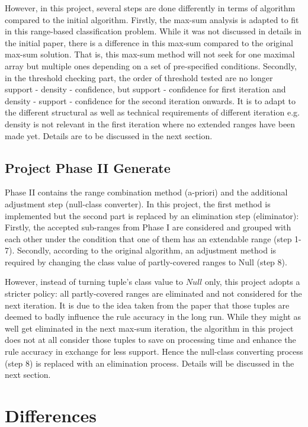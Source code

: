 However, in this project, several steps are done differently in terms of algorithm compared to the initial algorithm. Firstly, the max-sum analysis is adapted to fit in this range-based classification problem. While it was not discussed in details in the initial paper, there is a difference in this max-sum compared to the original max-sum solution. That is, this max-sum method will not seek for one maximal array but multiple ones depending on a set of pre-specified conditions. Secondly, in the threshold checking part, the order of threshold tested are no longer support - density - confidence, but support - confidence for first iteration and density - support - confidence for the second iteration onwards. It is to adapt to the different structural as well as technical requirements of different iteration e.g. density is not relevant in the first iteration where no extended ranges have been made yet. Details are to be discussed in the next section.

\subsection{Project Phase II Generate}

Phase II contains the range combination method (a-priori) and the additional adjustment step (null-class converter). In this project, the first method is implemented but the second part is replaced by an elimination step (eliminator): Firstly, the accepted sub-ranges from Phase I are considered and grouped with each other under the condition that one of them has an extendable range (step 1-7). Secondly, according to the original algorithm, an adjustment method is required by changing the class value of partly-covered ranges to Null (step 8). 

However, instead of turning tuple's class value to $Null$ only, this project adopts a stricter policy: all partly-covered ranges are eliminated and not considered for the next iteration. It is due to the idea taken from the paper that those tuples are deemed to badly influence the rule accuracy in the long run. While they might as well get eliminated in the next max-sum iteration, the algorithm in this project does not at all consider those tuples to save on processing time and enhance the rule accuracy in exchange for less support. Hence the null-class converting process (step 8) is replaced with an elimination process. Details will be discussed in the next section.

\section{Differences}

